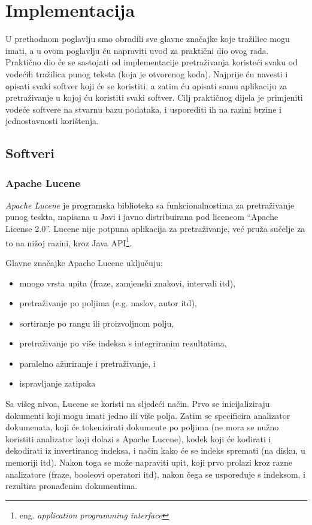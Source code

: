 \documentclass[a4paper,twoside,12pt]{scrreprt}
\begin{document}
\chapter{Implementacija}

U prethodnom poglavlju smo obradili sve glavne značajke koje tražilice mogu imati, a u ovom poglavlju ću napraviti uvod za praktični dio ovog rada. Praktično dio će se sastojati od implementacije pretraživanja koristeći svaku od vodećih tražilica punog teksta (koja je otvorenog koda). Najprije ću navesti i opisati svaki softver koji će se koristiti, a zatim ću opisati samu aplikaciju za pretraživanje u kojoj ću koristiti svaki softver. Cilj praktičnog dijela je primjeniti vodeće softvere na stvarnu bazu podataka, i usporediti ih na razini brzine i jednostavnosti korištenja.

\section{Softveri}

\subsection{Apache Lucene}

\textit{Apache Lucene} je programska biblioteka sa funkcionalnostima za pretraživanje punog teskta, napisana u Javi i javno distribuirana pod licencom ``Apache License 2.0''. Lucene nije potpuna aplikacija za pretraživanje, već pruža sučelje za to na nižoj razini, kroz Java API\footnote{eng. \textit{application programming interface}}.

Glavne značajke Apache Lucene uključuju:

\begin{itemize}
  \item mnogo vrsta upita (fraze, zamjenski znakovi, intervali itd),
  \item pretraživanje po poljima (e.g. naslov, autor itd),
  \item sortiranje po rangu ili proizvoljnom polju,
  \item pretraživanje po više indeksa s integriranim rezultatima,
  \item paralelno ažuriranje i pretraživanje, i
  \item ispravljanje zatipaka
\end{itemize}

Sa višeg nivoa, Lucene se koristi na sljedeći način. Prvo se inicijaliziraju dokumenti koji mogu imati jedno ili više polja. Zatim se specificira analizator dokumenata, koji će tokenizirati dokumente po poljima (ne mora se nužno koristiti analizator koji dolazi s Apache Lucene), kodek koji će kodirati i dekodirati iz invertiranog indeksa, i način kako će se indeks spremati (na disku, u memoriji itd). Nakon toga se može napraviti upit, koji prvo prolazi kroz razne analizatore (fraze, booleovi operatori itd), nakon čega se uspoređuje s indeksom, i rezultira pronađenim dokumentima.
\end{document}
